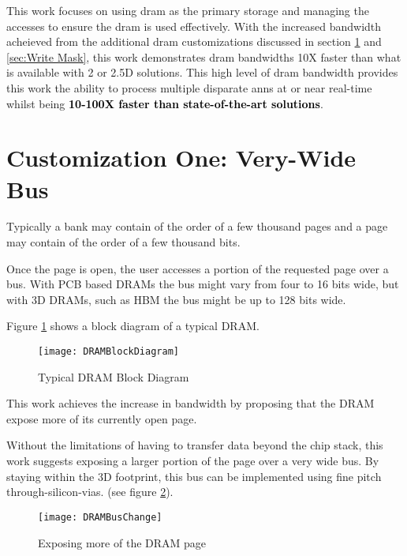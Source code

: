 This work focuses on using \ac{dram} as the primary storage and managing the accesses to ensure the \ac{dram} is used effectively. 
With the increased bandwidth acheieved from the additional \ac{dram} customizations discussed in section \ref{sec:Very-Wide Bus} and \ref{sec:Write Mask}, this work demonstrates \ac{dram} bandwidths 10X faster than what is available with 2 or 2.5D solutions.
This high level of \ac{dram} bandwidth provides this work the ability to process multiple disparate \acp{ann} at or near real-time whilst being \textbf{\textcolor{black}{10-100X faster than state-of-the-art solutions}}.


\section{Customization One: Very-Wide Bus}
\label{sec:Very-Wide Bus}

Typically a bank may contain of the order of a few thousand pages and a page may contain of the order of a few thousand bits.

Once the page is open, the user accesses a portion of the requested page over a bus. With PCB based DRAMs the bus might vary from four to 16 bits wide, but with 3D DRAMs, such as HBM the bus might be up to 128 bits wide.

Figure \ref{fig:dramBlockDiagram} shows a block diagram of a typical DRAM.

\begin{figure}[!t]
\centering
\captionsetup{justification=centering}
\centerline{
\mbox{\texttt{[image: DRAMBlockDiagram]}}
}
\caption{Typical DRAM Block Diagram}
\label{fig:dramBlockDiagram}
\end{figure}

This work achieves the increase in bandwidth by proposing that the DRAM expose more of its currently open page.

Without the limitations of having to transfer data beyond the chip stack, this work suggests exposing a larger portion of the page over a very wide bus. By staying within the 3D footprint, this bus can be implemented using fine pitch through-silicon-vias.
(see figure \ref{fig:dramBusChange}).

\begin{figure}[!t]
\centering
\captionsetup{justification=centering}
\captionsetup{width=.75\linewidth}
\centerline{
\mbox{\texttt{[image: DRAMBusChange]}}
}
\caption{Exposing more of the DRAM page}
\label{fig:dramBusChange}
\end{figure}

